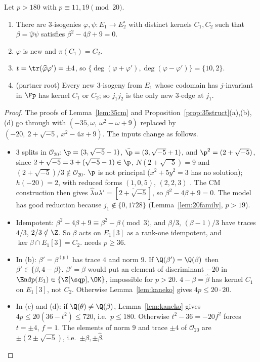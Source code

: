 \begin{lemma}\label{lem:20struct}
Let $p>180$ with $p\equiv11,19\pmod{20}$.
\begin{enumerate}[label=(\alph*)]
\item There are $3$-isogenies $\varphi,\psi:E_1\to E_2^\circ$ with distinct kernels $C_1,C_2$ such
  that $\beta=\widehat\varphi\psi$ satisfies $\beta^2-4\beta+9=0$.
\item $\varphi$ is new and $\pi(C_1)=C_2$.
\item $t=\tr(\widehat\varphi\varphi')=\pm4$, so $\{\deg(\varphi+\varphi'),\deg(\varphi-\varphi')\}=\{10,2\}$.
\item \textup{(partner root)} Every new $3$-isogeny from $E_1$ whose codomain has $j$-invariant in
  $\Fp$ has kernel $C_1$ or $C_2$; so $j_1j_2$ is the only new $3$-edge at $j_1$.
\end{enumerate}
\end{lemma}
\begin{proof}
The proofs of Lemma~\ref{lem:35cm} and Proposition~\ref{prop:35struct}(a),(b),(d) go through with
$(-35,\omega,\ \omega^2-\omega+9)$ replaced by $(-20,\ 2+\sqrt{-5},\ x^2-4x+9)$.  The inputs change as
follows.
\begin{itemize}
\item $3$ splits in $\mathcal O_{20}$: $\p=(3,\sqrt{-5}-1)$, $\bar\p=(3,\sqrt{-5}+1)$, and
  $\p^2=(2+\sqrt{-5})$, since $2+\sqrt{-5}=3+(\sqrt{-5}-1)\in\p$, $N(2+\sqrt{-5})=9$ and
  $(2+\sqrt{-5})/3\notin\mathcal O_{20}$.  $\p$ is not principal ($x^2+5y^2=3$ has no solution);
  $h(-20)=2$, with reduced forms $(1,0,5)$, $(2,2,3)$ \tagX.  The CM construction then gives
  $\widehat\lambda u\lambda'=[\overline{2+\sqrt{-5}}]$, so $\beta^2-4\beta+9=0$.  The model has good
  reduction because $j_1\notin\{0,1728\}$ (Lemma~\ref{lem:20family}, $p>19$).
\item Idempotent: $\beta^2-4\beta+9\equiv\beta^2-\beta\pmod3$, and $\beta/3$, $(\beta-1)/3$ have
  traces $4/3$, $2/3\notin\Z$.  So $\beta$ acts on $E_1[3]$ as a rank-one idempotent, and
  $\ker\beta\cap E_1[3]=C_2$.  \cite[Prop.~23]{BS} needs $p\ge36$.
\item In (b): $\beta'=\beta^{(p)}$ has trace $4$ and norm $9$.  If $\Q(\beta')=\Q(\beta)$ then
  $\beta'\in\{\beta,4-\beta\}$.  $\beta'=\beta$ would put an element of discriminant $-20$ in
  $\Endp(E_1)\in\{\Z[\sqp],\OK\}$, impossible for $p>20$.  $4-\beta=\widehat\beta$ has kernel $C_1$
  on $E_1[3]$, not $C_2$.  Otherwise Lemma~\ref{lem:kaneko} gives $4p\le20\cdot20$.
\item In (c) and (d): if $\Q(\theta)\ne\Q(\beta)$, Lemma~\ref{lem:kaneko} gives
  $4p\le20(36-t^2)\le720$, i.e.\ $p\le180$.  Otherwise $t^2-36=-20f^2$ forces $t=\pm4$, $f=1$.  The
  elements of norm $9$ and trace $\pm4$ of $\mathcal O_{20}$ are $\pm(2\pm\sqrt{-5})$, i.e.\
  $\pm\beta,\pm\widehat\beta$.
\end{itemize}
\end{proof}

